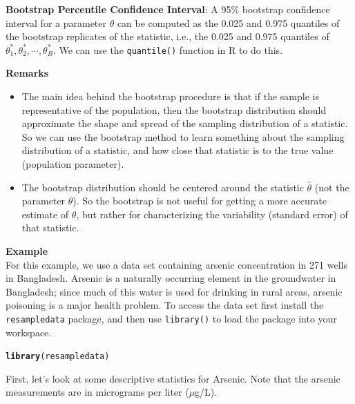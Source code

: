 \documentclass[fleqn, 12pt]{article}\usepackage[]{graphicx}\usepackage[]{color}
\makeatletter
\newcommand{\hlstd}[1]{\textcolor[rgb]{0.345,0.345,0.345}{#1}}%
\newcommand{\hlkwd}[1]{\textcolor[rgb]{0.737,0.353,0.396}{\textbf{#1}}}%
\newenvironment{kframe}{%
 \def\at@end@of@kframe{}%
 \ifinner\ifhmode%
  \def\at@end@of@kframe{\end{minipage}}%
  \begin{minipage}{\columnwidth}%
 \fi\fi%
 \def\FrameCommand##1{\hskip\@totalleftmargin \hskip-\fboxsep
 \colorbox{shadecolor}{##1}\hskip-\fboxsep
     \hskip-\linewidth \hskip-\@totalleftmargin \hskip\columnwidth}%
 \MakeFramed {\advance\hsize-\width
   \@totalleftmargin\z@ \linewidth\hsize
   \@setminipage}}%
 {\par\unskip\endMakeFramed%
 \at@end@of@kframe}
\newenvironment{knitrout}{}{} %
\makeatother
\begin{document}
\textbf{Bootstrap Percentile Confidence Interval}:  A 95\% bootstrap confidence interval for a parameter $\theta$ can be computed as the 0.025 and 0.975 quantiles of the bootstrap replicates of the statistic, i.e., the 0.025 and 0.975 quantiles of $\theta_1^*, \theta_2^*, \cdots, \theta_B^*$.  We can use the \texttt{quantile()} function in R to do this.\\   
\clearpage

\textbf{Remarks}
\begin{itemize}
\item The main idea behind the bootstrap procedure is that if the sample is representative of the population, then the bootstrap distribution should approximate the shape and spread of the sampling distribution of a statistic.  So we can use the bootstrap method to learn something about the sampling distribution of a statistic, and how close that statistic is to the true value (population parameter).
\item The bootstrap distribution should be centered around the statistic $\hat{\theta}$ (not the parameter $\theta$).  So the bootstrap is not useful for getting a more accurate estimate of $\theta$, but rather for characterizing the variability (standard error) of that statistic.\\ 
\end{itemize}

\textbf{Example}\\
For this example, we use a data set containing arsenic concentration in 271 wells in Bangladesh.  Arsenic is a naturally occurring element in the groundwater in Bangladesh; since much of this water is used for drinking in rural areas, arsenic poisoning is a major health problem.  To access the data set first install the \texttt{resampledata} package, and then use \texttt{library()} to load the package into your workspace.

\begin{knitrout}
\color{fgcolor}\begin{kframe}
\begin{alltt}
\hlkwd{library}\hlstd{(resampledata)}
\end{alltt}
\end{kframe}
\end{knitrout}

First, let's look at some descriptive statistics for Arsenic.  Note that the arsenic measurements are in micrograms per liter ($\mu$g/L).
\end{document}
